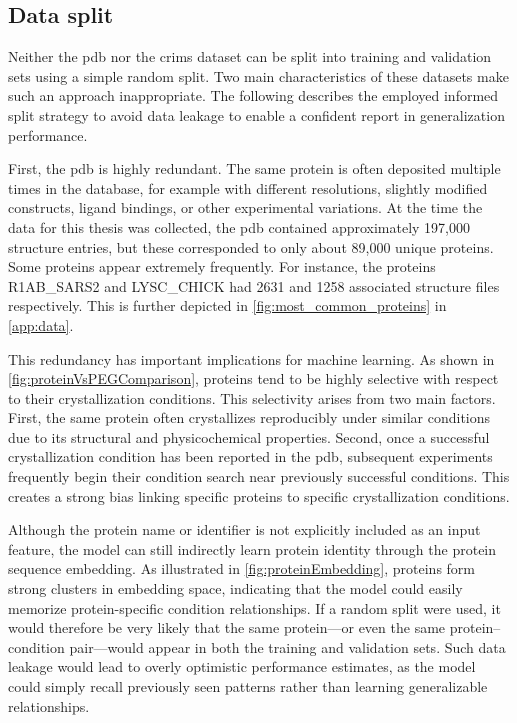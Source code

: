 \subsection{Data split}\label{sec:methods/evaluation/data_split}
Neither the \gls{pdb} nor the \gls{crims} dataset can be split into training and validation sets using a simple random split. Two main characteristics of these datasets make such an approach inappropriate. The following describes the employed informed split strategy to avoid data leakage to enable a confident report in generalization performance.

First, the \gls{pdb} is highly redundant. The same protein is often deposited multiple times in the database, for example with different resolutions, slightly modified constructs, ligand bindings, or other experimental variations. At the time the data for this thesis was collected, the \gls{pdb} contained approximately 197,000 structure entries, but these corresponded to only about 89,000 unique proteins. Some proteins appear extremely frequently. For instance, the proteins R1AB\_SARS2 and LYSC\_CHICK had 2631 and 1258 associated structure files respectively. This is further depicted in \autoref{fig:most_common_proteins} in \autoref{app:data}.


This redundancy has important implications for machine learning. As shown in \autoref{fig:proteinVsPEGComparison}, proteins tend to be highly selective with respect to their crystallization conditions. This selectivity arises from two main factors. First, the same protein often crystallizes reproducibly under similar conditions due to its structural and physicochemical properties. Second, once a successful crystallization condition has been reported in the \gls{pdb}, subsequent experiments frequently begin their condition search near previously successful conditions. This creates a strong bias linking specific proteins to specific crystallization conditions.

Although the protein name or identifier is not explicitly included as an input feature, the model can still indirectly learn protein identity through the protein sequence embedding. As illustrated in \autoref{fig:proteinEmbedding}, proteins form strong clusters in embedding space, indicating that the model could easily memorize protein-specific condition relationships. If a random split were used, it would therefore be very likely that the same protein—or even the same protein–condition pair—would appear in both the training and validation sets. Such data leakage would lead to overly optimistic performance estimates, as the model could simply recall previously seen patterns rather than learning generalizable relationships.

